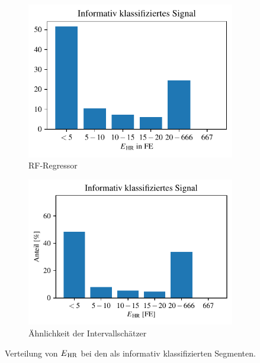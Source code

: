  \begin{figure}[h]
 	\centering
		\begin{subfigure}{.45\textwidth}
			\centering
 			\includegraphics[scale=0.7]{pic/rf-own-final-10-positives.pdf}
 			\caption{\ac{RF}-Regressor}
 		\end{subfigure}
    	\begin{subfigure}{.45\textwidth}
    		\centering
 			\includegraphics[scale=0.7]{pic/brueser03-positives.pdf}
 			\caption{Ähnlichkeit der Intervallschätzer}
 		\end{subfigure}
 	\caption{Verteilung von $E\textsubscript{HR}$ bei den als informativ klassifizierten Segmenten.}
 	\label{fig:own-10-positives}
 \end{figure}
 
